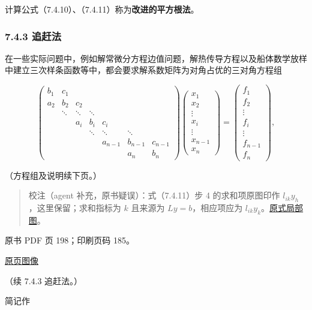 计算公式（7.4.10）、（7.4.11）称为\textbf{改进的平方根法}。

\subsubsection{7.4.3 追赶法}\label{ch07b-ux8ffdux8d76ux6cd5}

在一些实际问题中，例如解常微分方程边值问题，解热传导方程以及船体数学放样中建立三次样条函数等中，都会要求解系数矩阵为对角占优的三对角方程组

\[
\begin{pmatrix}
b_1&c_1&&&&&\\
a_2&b_2&c_2&&&&\\
&\ddots&\ddots&\ddots&&&\\
&&a_i&b_i&c_i&&\\
&&&\ddots&\ddots&\ddots&\\
&&&&a_{n-1}&b_{n-1}&c_{n-1}\\
&&&&&a_n&b_n
\end{pmatrix}
\begin{pmatrix}x_1\\x_2\\\vdots\\x_i\\\vdots\\x_{n-1}\\x_n\end{pmatrix}
=
\begin{pmatrix}f_1\\f_2\\\vdots\\f_i\\\vdots\\f_{n-1}\\f_n\end{pmatrix},
\]

（方程组及说明续下页。）

\begin{quote}
校注（agent 补充，原书疑误）：式（7.4.11）步 4 的求和项原图印作 \(l_{ik}y_h\)，这里保留；求和指标为 \(k\) 且来源为 \(Ly=b\)，相应项应为 \(l_{ik}y_k\)。\href{verified/assets/ch07b/197-solves.png}{原式局部图}。
\end{quote}

\clearpage

原书 PDF 页 198；印刷页码 185。

\href{source-images/pdf-198.jpeg}{原页图像}

（续 7.4.3 追赶法。）

简记作


